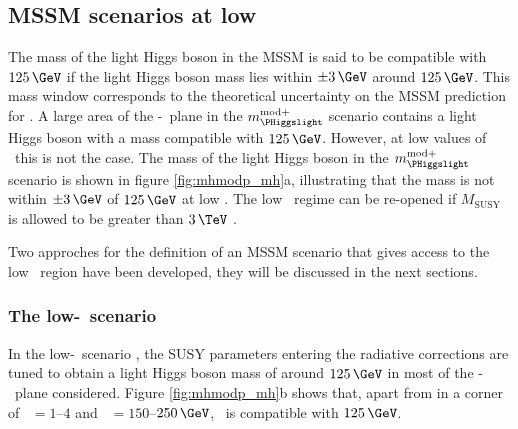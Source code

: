 \subsection{MSSM scenarios at low \tanb}
\label{sec:mssm_theory_lowtb}
The mass of the light Higgs boson in the \ac{MSSM} is said to
be compatible with $125\,\GeV$ if the light Higgs boson mass lies within 
$\pm 3\,\GeV$ around $125\,\GeV$. This mass window
corresponds to the theoretical uncertainty on the \ac{MSSM} prediction for \mh.
A large area of the \mA-\tanb~plane in the $m_{\PHiggslight}^{\text{mod+}}$ 
scenario contains a light Higgs boson with a mass compatible with
$125\,\GeV$. However, at low values of \tanb~this is not the case.
The mass of the light Higgs
boson in the $m_{\PHiggslight}^{\text{mod}+}$ scenario is shown in 
figure \ref{fig:mhmodp_mh}a, illustrating that the mass 
is not within $\pm 3\,\GeV$ of $125\,\GeV$ at low \tanb. The low \tanb~regime can be re-opened
if $M_{\text{SUSY}}$ is allowed to be greater than $3\,\TeV$ \cite{MSSM-reopen}. 
%


Two approches for the definition of an \ac{MSSM} scenario that gives
access to the low \tanb~region have been developed, they will be
discussed in the next sections.

\subsubsection{The low-\tanb~scenario}
\label{sec:theory_BSM_model_lowtb}
In the low-\tanb~scenario \cite{Hein-low-tb-high,MSSM-lowtanb}, the SUSY parameters entering
the radiative corrections are tuned to obtain a light 
Higgs boson mass of around $125\,\GeV$ in most of the \mA-\tanb~plane considered.
Figure \ref{fig:mhmodp_mh}b shows that, apart from in a corner of \tanb~$=1$--$4$ and 
\mA~$=150$--$250\,\GeV$, \mh~is compatible with $125\,\GeV$.

